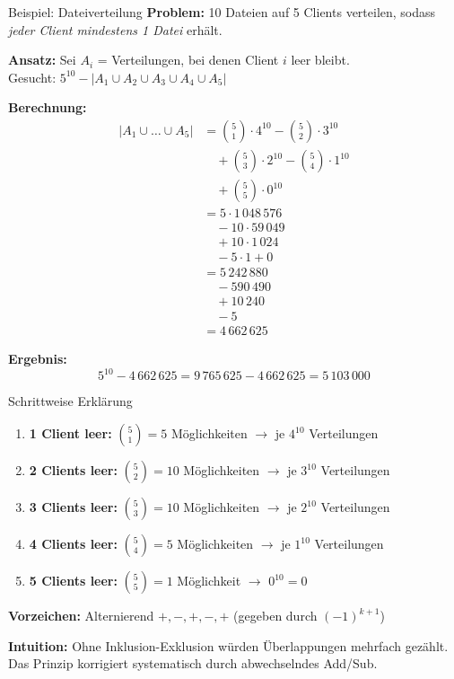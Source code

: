 \documentclass[a4paper, fontsize=7pt]{scrartcl}
\begin{document}
\begin{mainbox}{Beispiel: Dateiverteilung}
\textbf{Problem:} 10 Dateien auf 5 Clients verteilen, sodass \emph{jeder Client mindestens 1 Datei} erhält.

\textbf{Ansatz:} Sei $A_i$ = Verteilungen, bei denen Client $i$ leer bleibt.\\
Gesucht: $5^{10} - |A_1 \cup A_2 \cup A_3 \cup A_4 \cup A_5|$

\textbf{Berechnung:}
\begin{align*}
|A_1 \cup \ldots \cup A_5| &= \binom{5}{1} \cdot 4^{10}
- \binom{5}{2} \cdot 3^{10}\\
&\quad + \binom{5}{3} \cdot 2^{10}
- \binom{5}{4} \cdot 1^{10}\\
&\quad + \binom{5}{5} \cdot 0^{10}\\[0.5em]
&= 5 \cdot 1\,048\,576\\
&\quad - 10 \cdot 59\,049\\
&\quad + 10 \cdot 1\,024\\
&\quad - 5 \cdot 1 + 0\\[0.5em]
&= 5\,242\,880\\
&\quad - 590\,490\\
&\quad + 10\,240\\
&\quad - 5\\[0.5em]
&= 4\,662\,625
\end{align*}

\textbf{Ergebnis:}
\[
5^{10} - 4\,662\,625 = 9\,765\,625 - 4\,662\,625 = \boxed{5\,103\,000}
\]
\end{mainbox}

\begin{subbox}{Schrittweise Erklärung}
\begin{enumerate}
  \item \textbf{1 Client leer:} $\binom{5}{1} = 5$ Möglichkeiten $\to$ je $4^{10}$ Verteilungen
  \item \textbf{2 Clients leer:} $\binom{5}{2} = 10$ Möglichkeiten $\to$ je $3^{10}$ Verteilungen
  \item \textbf{3 Clients leer:} $\binom{5}{3} = 10$ Möglichkeiten $\to$ je $2^{10}$ Verteilungen
  \item \textbf{4 Clients leer:} $\binom{5}{4} = 5$ Möglichkeiten $\to$ je $1^{10}$ Verteilungen
  \item \textbf{5 Clients leer:} $\binom{5}{5} = 1$ Möglichkeit $\to$ $0^{10} = 0$
\end{enumerate}

\textbf{Vorzeichen:} Alternierend $+, -, +, -, +$ (gegeben durch $(-1)^{k+1}$)

\textbf{Intuition:} Ohne Inklusion-Exklusion würden Überlappungen mehrfach gezählt. Das Prinzip korrigiert systematisch durch abwechselndes Add/Sub.
\end{subbox}
\end{document}
